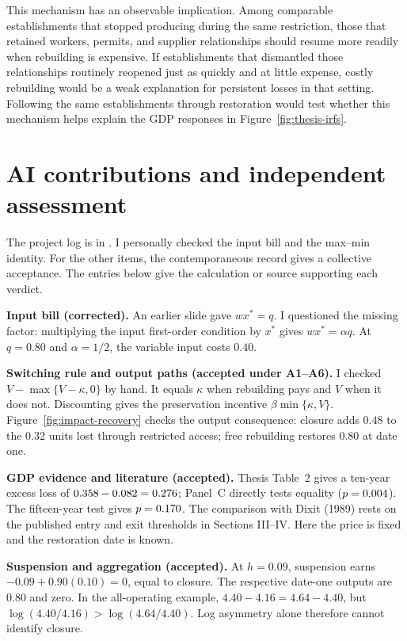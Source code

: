 \documentclass[11pt,letterpaper]{article}
\begin{document}
This mechanism has an observable implication. Among comparable establishments that stopped producing during the same restriction, those that retained workers, permits, and supplier relationships should resume more readily when rebuilding is expensive. If establishments that dismantled those relationships routinely reopened just as quickly and at little expense, costly rebuilding would be a weak explanation for persistent losses in that setting. Following the same establishments through restoration would test whether this mechanism helps explain the GDP responses in Figure~\ref{fig:thesis-irfs}.
\renewcommand{\bibfont}{\small\raggedright}
\setlength{\bibsep}{3pt}



\clearpage
\appendix
\section{AI contributions and independent assessment}
The project log is in . I personally checked the input bill and the max--min identity. For the other items, the contemporaneous record gives a collective acceptance. The entries below give the calculation or source supporting each verdict.

\textbf{Input bill (corrected).} An earlier slide gave $wx^*=q$. I questioned the missing factor: multiplying the input first-order condition by $x^*$ gives $wx^*=\alpha q$. At $q=0.80$ and $\alpha=1/2$, the variable input costs $0.40$.

\textbf{Switching rule and output paths (accepted under A1--A6).} I checked $V-\max\{V-\kappa,0\}$ by hand. It equals $\kappa$ when rebuilding pays and $V$ when it does not. Discounting gives the preservation incentive $\beta\min\{\kappa,V\}$. Figure~\ref{fig:impact-recovery} checks the output consequence: closure adds $0.48$ to the $0.32$ units lost through restricted access; free rebuilding restores $0.80$ at date one.

\textbf{GDP evidence and literature (accepted).} Thesis Table~2 gives a ten-year excess loss of $0.358-0.082=0.276$; Panel~C directly tests equality ($p=0.004$). The fifteen-year test gives $p=0.170$. The comparison with Dixit (1989) rests on the published entry and exit thresholds in Sections III--IV. Here the price is fixed and the restoration date is known.

\textbf{Suspension and aggregation (accepted).} At $h=0.09$, suspension earns $-0.09+0.90(0.10)=0$, equal to closure. The respective date-one outputs are $0.80$ and zero. In the all-operating example, $4.40-4.16=4.64-4.40$, but $\log(4.40/4.16)>\log(4.64/4.40)$. Log asymmetry alone therefore cannot identify closure.
\end{document}
